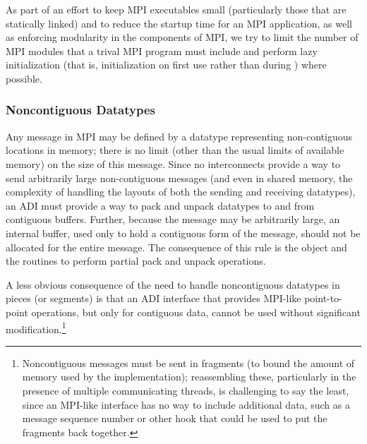 \documentclass{article}
\begin{document}
As part of an effort to keep MPI executables small (particularly those
that are statically linked) and to reduce the
startup time for an MPI application, as well as enforcing modularity
in the components of MPI, we try to limit the number of MPI modules
that a trival MPI program must include and perform lazy initialization
(that is, initialization on first use rather than during
) where possible.

\subsubsection{Noncontiguous Datatypes}
Any message in MPI may be defined by a datatype representing
non-contiguous locations in memory; there is no limit (other than the
usual limits of available memory) on the size of this message.  Since
no interconnects provide a way to send arbitrarily large
non-contiguous messages (and even in shared memory, the complexity of
handling the layouts of both the sending and receiving datatypes), an
ADI must provide a way to pack and unpack datatypes to and from
contiguous buffers.  
Further, because the message may be arbitrarily large, an internal
buffer,
used only to hold a contiguous form of the message, should
not be allocated for the entire message.
The consequence of this rule is the  object and the
routines to perform partial pack and unpack operations.

A less obvious consequence of the need to handle noncontiguous
datatypes in pieces (or segments) is that an ADI interface that
provides MPI-like point-to-point operations, but only for contiguous
data, cannot be used without significant modification.\footnote{Noncontiguous
  messages must be sent in fragments (to bound the amount of memory
  used by the implementation); reassembling these, particularly in the
  presence of multiple communicating threads, is challenging to say the least,
  since an MPI-like interface has no way to include additional data, such as a
  message sequence number or other hook that could be used to put the
  fragments back together.}

\end{document}
